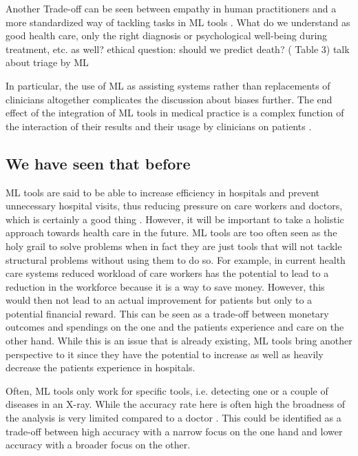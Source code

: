 Another Trade-off can be seen between empathy in human practitioners and a more standardized way of tackling tasks in ML tools \cite{Morley2020}. What do we understand as good health care, only the right diagnosis or psychological well-being during treatment,  etc.  as well? 
ethical question: should we predict death? (\cite{topol2019high} Table 3) \cite{he2019practical} talk about triage by ML



In particular, the use of ML as assisting systems rather than replacements of clinicians altogether complicates the discussion about biases further.
The end effect of the integration of ML tools in medical practice is a complex function of the interaction of their results and their usage by clinicians on patients \cite[p.~4]{Rajkomar2018}.


\subsection{We have seen that before}


ML tools are said to be able to increase efficiency in hospitals and prevent unnecessary hospital visits, thus reducing pressure on care workers and doctors, which is certainly a good thing \cite{horgan2019artificial}. However, it will be important to take a holistic approach towards health care in the future. ML tools are too often seen as the holy grail to solve problems when in fact they are just tools that will not tackle structural problems without using them to do so. For example, in current health care systems reduced workload of care workers has the potential to lead to a reduction in the workforce because it is a way to save money. However, this would then not lead to an actual improvement for patients but only to a potential financial reward. This can be seen as a trade-off between monetary outcomes and spendings on the one  and the patients experience and care on the other hand. While this is an issue that is already existing, ML tools bring another perspective to it since they have the potential to increase as well as heavily decrease the patients experience in hospitals.



Often, ML tools only work for specific tools, i.e. detecting one or a couple of diseases in an X-ray. While the accuracy rate here is often high the broadness of the analysis is very limited compared to a doctor \cite{topol2019high}. This could be identified as a trade-off between high accuracy with a narrow focus on the one hand and lower accuracy with a broader focus on the other.


